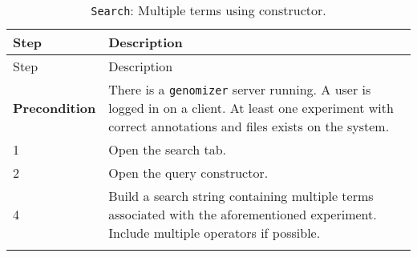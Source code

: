 \begin{longtable}[c]{@{}ll@{}}
\caption{\texttt{Search}: Multiple terms using
constructor.}\tabularnewline
\toprule
\begin{minipage}[b]{0.31\columnwidth}\raggedright\strut
Step
\strut\end{minipage} &
\begin{minipage}[b]{0.63\columnwidth}\raggedright\strut
Description
\strut\end{minipage}\tabularnewline
\midrule
\endfirsthead
\toprule
\begin{minipage}[b]{0.31\columnwidth}\raggedright\strut
Step
\strut\end{minipage} &
\begin{minipage}[b]{0.63\columnwidth}\raggedright\strut
Description
\strut\end{minipage}\tabularnewline
\midrule
\endhead
\begin{minipage}[t]{0.31\columnwidth}\raggedright\strut
\textbf{Precondition}
\strut\end{minipage} &
\begin{minipage}[t]{0.63\columnwidth}\raggedright\strut
There is a \texttt{genomizer} server running. A user is logged in on a
client. At least one experiment with correct annotations and files
exists on the system.
\strut\end{minipage}\tabularnewline
\begin{minipage}[t]{0.31\columnwidth}\raggedright\strut
1
\strut\end{minipage} &
\begin{minipage}[t]{0.63\columnwidth}\raggedright\strut
Open the search tab.
\strut\end{minipage}\tabularnewline
\begin{minipage}[t]{0.31\columnwidth}\raggedright\strut
2
\strut\end{minipage} &
\begin{minipage}[t]{0.63\columnwidth}\raggedright\strut
Open the query constructor.
\strut\end{minipage}\tabularnewline
\begin{minipage}[t]{0.31\columnwidth}\raggedright\strut
4
\strut\end{minipage} &
\begin{minipage}[t]{0.63\columnwidth}\raggedright\strut
Build a search string containing multiple terms associated with the
aforementioned experiment. Include multiple operators if possible.
\strut\end{minipage}\tabularnewline
\begin{minipage}[t]{0.31\columnwidth}\raggedright\strut

\end{minipage}
\end{longtable}
